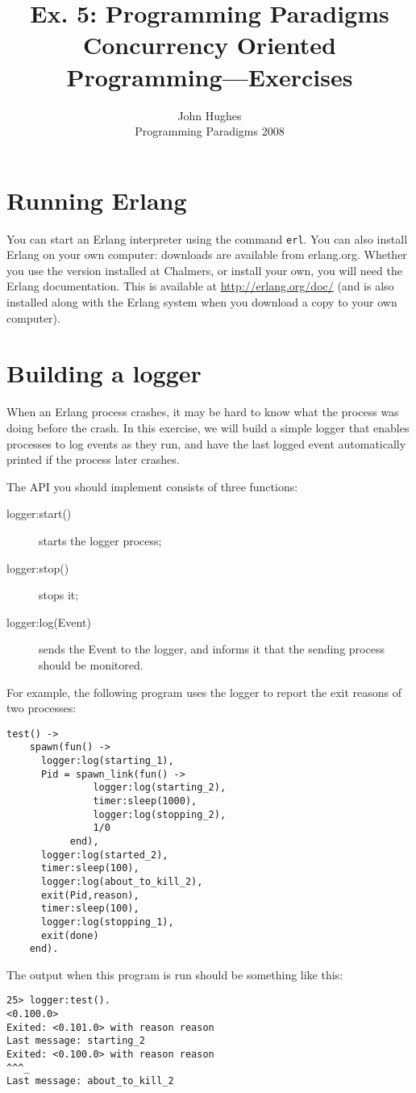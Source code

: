\documentclass{article}
\newcommand{\courseinfo}{ John Hughes \\ Programming Paradigms 2008 }
\begin{document}
\title{Ex. 5: Programming Paradigms 
\\
Concurrency Oriented Programming—Exercises}
\author{\courseinfo}
\date{}
\maketitle

\section{Running Erlang}

You can start an Erlang interpreter using the command \verb!erl!. You can also install Erlang on your own computer: downloads are available from erlang.org. Whether you use the version installed at Chalmers, or install your own, you will need the Erlang documentation. This is available at \url{http://erlang.org/doc/} (and is also installed along with the Erlang system when you download a copy to your own computer).


\section{Building a logger}

When an Erlang process crashes, it may be hard to know what the
process was doing before the crash. In this exercise, we will build a
simple logger that enables processes to log events as they run, and
have the last logged event automatically printed if the process later
crashes.

The API you should implement consists of three functions:

\begin{description}
\item[logger:start()]  starts the logger process;
\item[logger:stop()]   stops it;
\item[logger:log(Event)]  sends the \textsf{Event} to the logger, and informs it that the sending process should be monitored.
\end{description}

For example, the following program uses the logger to report the exit reasons of two processes:
\begin{verbatim}
test() ->
    spawn(fun() ->
	  logger:log(starting_1),
	  Pid = spawn_link(fun() ->
			   logger:log(starting_2),
			   timer:sleep(1000),
			   logger:log(stopping_2),
			   1/0
		   end),
	  logger:log(started_2),
	  timer:sleep(100),
	  logger:log(about_to_kill_2),
	  exit(Pid,reason),
	  timer:sleep(100),
	  logger:log(stopping_1),
	  exit(done)
	end).
\end{verbatim}
The output when this program is run should be something  like this:
\begin{verbatim}
25> logger:test().
<0.100.0>
Exited: <0.101.0> with reason reason
Last message: starting_2
Exited: <0.100.0> with reason reason
^^^_
Last message: about_to_kill_2
\end{verbatim}
\end{document}
